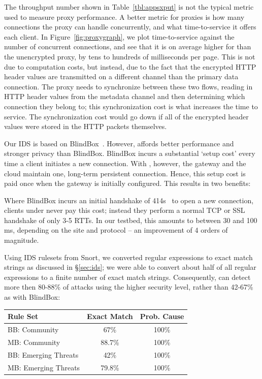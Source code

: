  The throughput number shown in Table~\ref{tbl:appsxput} is not the typical metric used to measure proxy performance. A better metric for proxies is how many connections the proxy can handle concurrently, and what time-to-service it offers each client. In Figure~\ref{fig:proxygraph}, we plot time-to-service against the number of concurrent connections, and see that it is on average higher for \sys than the unencrypted proxy, by tens to hundreds of milliseconds per page.
This is not due to computation costs, but instead, due to the fact that the encrypted HTTP header values are transmitted on a different channel than the primary data connection.
The \sys proxy needs to synchronize between these two flows, reading in HTTP header values from the metadata channel and then determining which connection they belong to; this synchronization cost is what increases the time to service. 
The synchronization cost would go down if all of the encrypted header values were stored in the HTTP packets themselves.


Our IDS is based on BlindBox~\cite{blindbox}. However, \sys affords better performance and stronger privacy than BlindBox. BlindBox incurs a substantial `setup cost' every time a client initiates a new connection. With \sys, however, the gateway and the cloud maintain one, long-term persistent connection. 
Hence, this setup cost is paid once when the gateway is initially configured. This results in two benefits:

 Where BlindBox incurs an initial handshake of 414s~\cite{blindbox} to open a new connection, clients under \sys never pay this cost; instead they perform a normal TCP or SSL handshake of only 3-5 RTTs. In our testbed, this amounts to between 30 and 100 ms, depending on the site and protocol -- an improvement of 4 orders of magnitude.

Using IDS rulesets from Snort, we converted regular expressions to exact match strings as discussed in \S\ref{sec:ids}; we were able to convert about half of all regular expressions to a finite number of exact match strings. 
Consequently, \sys can detect more then 80-88\% of attacks using the higher security level, rather than 42-67\% as with BlindBox:

\begin{table}[h]
  \centering
  \small
  \begin{tabular}{l|c|c}
    {{\bf Rule Set}}&{\bf Exact Match}&{\bf Prob. Cause}\\
    \hline
    \hline
    BB: Community&67\%&100\%\\
    \hline
    MB: Community&88.7\%&100\%\\

    \hline
    \hline
    BB: Emerging Threats&42\%&100\%\\
    \hline
    MB: Emerging Threats&79.8\%&100\%\\
    \hline
  \end{tabular}
\end{table}


